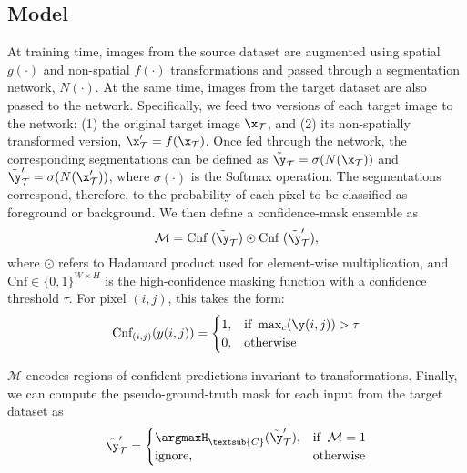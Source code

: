 \subsection{Model} 
At training time, images from the source dataset are augmented using spatial $g(\cdot)$ and non-spatial $f(\cdot)$ transformations and passed through a segmentation network, $N(\cdot)$. At the same time, images from the target dataset are also passed to the network. Specifically, we feed two versions of each target image to the network: (1) the original target image $\x_\mathcal{T}$, and (2) its non-spatially transformed version, $\x'_\mathcal{T} = f(\x_\mathcal{T})$. Once fed through the network, the corresponding segmentations can be defined as $\tilde{\y}_{\mathcal{T}} = \sigma(N(\x_{\mathcal{T}}))$ and $\tilde{\y}'_{\mathcal{T}} = \sigma(N(\x'_{\mathcal{T}}))$, where $\sigma(\cdot)$ is the Softmax operation. The segmentations correspond, therefore, to the probability of each pixel to be classified as foreground or background. We then define a confidence-mask ensemble as
\begin{equation}
\mathcal{M} = \text{Cnf}~(\tilde{\y}_{\mathcal{T}}) \odot \text{Cnf}~(\tilde{\y}'_{\mathcal{T}}),
\label{eq:ensemble_confidence}
\end{equation}
where $\odot$ refers to Hadamard product used for element-wise multiplication, and $\text{Cnf} \in \{0, 1\}^{W\times H}$ is the high-confidence masking function with a confidence threshold $\tau$. For pixel $(i,j)$, this takes the form:
\begin{equation}
    \text{Cnf}_{(i,j)}(y(i,j)) =
    \begin{cases}
        1, & \text{if    } \max_c(\y(i,j)) > \tau\\
        0, & \text{otherwise  }
    \end{cases}
    \label{eq:filtering}
\end{equation}

$\mathcal{M}$ encodes regions of confident predictions invariant to transformations. Finally, we can compute the pseudo-ground-truth mask for each input from the target dataset as
\begin{equation}
\hat{\y}'_{\mathcal{T}} = 
    \begin{cases}
        \argmaxH_{\textsub{C}} (\tilde{\y}'_{\mathcal{T}}), & \text{if  } \:\mathcal{M} = 1\\
        \text{ignore}, & \text{otherwise}
    \end{cases}
\end{equation}

